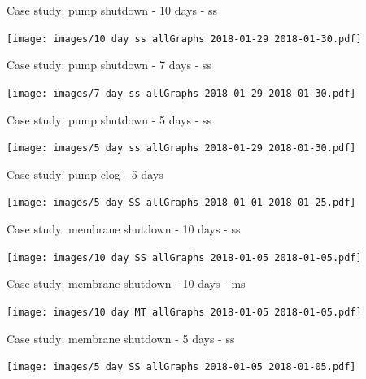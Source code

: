 \documentclass{beamer}
\begin{document}
\begin{frame}{Case study: pump shutdown - 10 days - ss}
\protect\hypertarget{case-study-pump-shutdown---10-days---ss}{}

\texttt{[image: images/10 day ss allGraphs 2018-01-29 2018-01-30.pdf]}

\end{frame}

\begin{frame}{Case study: pump shutdown - 7 days - ss}
\protect\hypertarget{case-study-pump-shutdown---7-days---ss}{}

\texttt{[image: images/7 day ss allGraphs 2018-01-29 2018-01-30.pdf]}

\end{frame}

\begin{frame}{Case study: pump shutdown - 5 days - ss}
\protect\hypertarget{case-study-pump-shutdown---5-days---ss}{}

\texttt{[image: images/5 day ss allGraphs 2018-01-29 2018-01-30.pdf]}

\end{frame}

\begin{frame}{Case study: pump clog - 5 days}
\protect\hypertarget{case-study-pump-clog---5-days}{}

\texttt{[image: images/5 day SS allGraphs 2018-01-01 2018-01-25.pdf]}

\end{frame}

\begin{frame}{Case study: membrane shutdown - 10 days - ss}
\protect\hypertarget{case-study-membrane-shutdown---10-days---ss}{}

\texttt{[image: images/10 day SS allGraphs 2018-01-05 2018-01-05.pdf]}

\end{frame}

\begin{frame}{Case study: membrane shutdown - 10 days - ms}
\protect\hypertarget{case-study-membrane-shutdown---10-days---ms}{}

\texttt{[image: images/10 day MT allGraphs 2018-01-05 2018-01-05.pdf]}

\end{frame}

\begin{frame}{Case study: membrane shutdown - 5 days - ss}
\protect\hypertarget{case-study-membrane-shutdown---5-days---ss}{}

\texttt{[image: images/5 day SS allGraphs 2018-01-05 2018-01-05.pdf]}

\end{frame}
\end{document}
